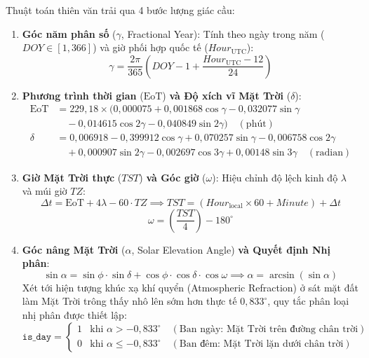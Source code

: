 \documentclass[12pt, a4paper]{report}
\begin{document}
Thuật toán thiên văn trải qua 4 bước lượng giác cầu:
\begin{enumerate}[label=\arabic*., leftmargin=*]
    \item \textbf{Góc năm phân số} ($\gamma$, Fractional Year): Tính theo ngày trong năm ($DOY \in [1, 366]$) và giờ phối hợp quốc tế ($Hour_{\text{UTC}}$):
    \begin{equation}
    \gamma = \frac{2\pi}{365} \left( DOY - 1 + \frac{Hour_{\text{UTC}} - 12}{24} \right)
    \end{equation}

    \item \textbf{Phương trình thời gian} ($\text{EoT}$) \textbf{và Độ xích vĩ Mặt Trời} ($\delta$):
    \begin{align}
    \text{EoT} &= 229{,}18 \times \big( 0{,}000075 + 0{,}001868\cos\gamma - 0{,}032077\sin\gamma \nonumber\\
        &\quad - 0{,}014615\cos 2\gamma - 0{,}040849\sin 2\gamma \big) \quad (\text{phút}) \\
    \delta &= 0{,}006918 - 0{,}399912\cos\gamma + 0{,}070257\sin\gamma - 0{,}006758\cos 2\gamma \nonumber\\
           &\quad + 0{,}000907\sin 2\gamma - 0{,}002697\cos 3\gamma + 0{,}00148\sin 3\gamma \quad (\text{radian})
    \end{align}

    \item \textbf{Giờ Mặt Trời thực} ($TST$) \textbf{và Góc giờ} ($\omega$): Hiệu chỉnh độ lệch kinh độ $\lambda$ và múi giờ $TZ$:
    \begin{equation}
    \Delta t = \text{EoT} + 4\lambda - 60 \cdot TZ \implies TST = (Hour_{\text{local}} \times 60 + Minute) + \Delta t
    \end{equation}
    \begin{equation}
    \omega = \left( \frac{TST}{4} \right) - 180^\circ
    \end{equation}

    \item \textbf{Góc nâng Mặt Trời} ($\alpha$, Solar Elevation Angle) \textbf{và Quyết định Nhị phân}:
    \begin{equation}
    \sin\alpha = \sin\phi \cdot \sin\delta + \cos\phi \cdot \cos\delta \cdot \cos\omega \implies \alpha = \arcsin(\sin\alpha)
    \end{equation}
    Xét tới hiện tượng khúc xạ khí quyển (Atmospheric Refraction) ở sát mặt đất làm Mặt Trời trông thấy nhô lên sớm hơn thực tế $0{,}833^\circ$, quy tắc phân loại nhị phân được thiết lập:
    \begin{equation}
    \texttt{is\_day} = \begin{cases}
    1 & \text{khi } \alpha > -0{,}833^\circ \quad (\text{Ban ngày: Mặt Trời trên đường chân trời}) \\
    0 & \text{khi } \alpha \le -0{,}833^\circ \quad (\text{Ban đêm: Mặt Trời lặn dưới chân trời})
    \end{cases}
    \end{equation}
\end{enumerate}
\end{document}
